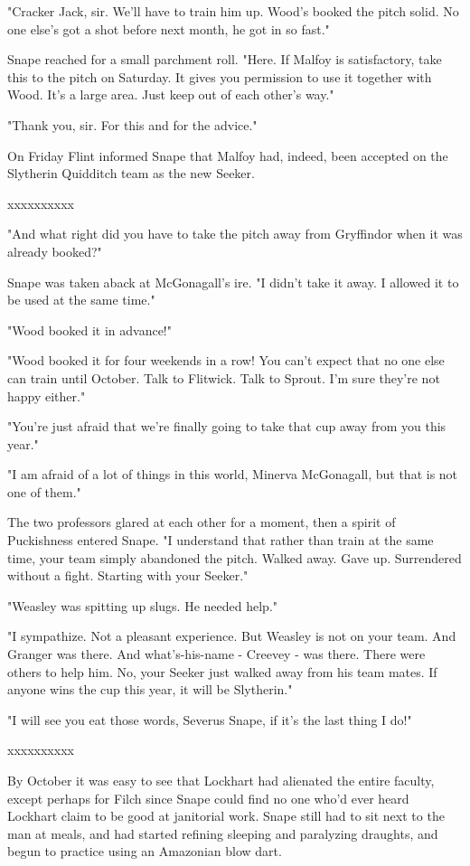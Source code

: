 \documentclass[a4paper,11pt]{article}
\begin{document}
"Cracker Jack, sir. We'll have to train him up. Wood's booked the pitch solid. No one else's got a shot before next month, he got in so fast."

Snape reached for a small parchment roll. "Here. If Malfoy is satisfactory, take this to the pitch on Saturday. It gives you permission to use it together with Wood. It's a large area. Just keep out of each other's way."

"Thank you, sir. For this and for the advice."

On Friday Flint informed Snape that Malfoy had, indeed, been accepted on the Slytherin Quidditch team as the new Seeker.

xxxxxxxxxx

"And what right did you have to take the pitch away from Gryffindor when it was already booked?"

Snape was taken aback at McGonagall's ire. "I didn't take it away. I allowed it to be used at the same time."

"Wood booked it in advance!"

"Wood booked it for four weekends in a row! You can't expect that no one else can train until October. Talk to Flitwick. Talk to Sprout. I'm sure they're not happy either."

"You're just afraid that we're finally going to take that cup away from you this year."

"I am afraid of a lot of things in this world, Minerva McGonagall, but that is not one of them."

The two professors glared at each other for a moment, then a spirit of Puckishness entered Snape. "I understand that rather than train at the same time, your team simply abandoned the pitch. Walked away. Gave up. Surrendered without a fight. Starting with your Seeker."

"Weasley was spitting up slugs. He needed help."

"I sympathize. Not a pleasant experience. But Weasley is not on your team. And Granger was there. And what's-his-name - Creevey - was there. There were others to help him. No, your Seeker just walked away from his team mates. If anyone wins the cup this year, it will be Slytherin."

"I will see you eat those words, Severus Snape, if it's the last thing I do!"

xxxxxxxxxx

By October it was easy to see that Lockhart had alienated the entire faculty, except perhaps for Filch since Snape could find no one who'd ever heard Lockhart claim to be good at janitorial work. Snape still had to sit next to the man at meals, and had started refining sleeping and paralyzing draughts, and begun to practice using an Amazonian blow dart.
\end{document}
